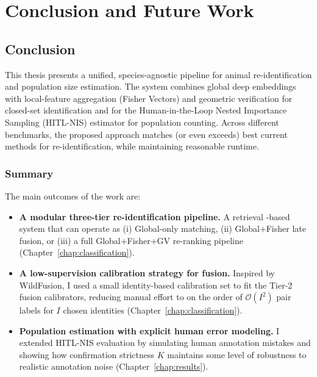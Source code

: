 \chapter{Conclusion and Future Work}
\label{chap:conclusion}

\section{Conclusion}
This thesis presents a unified, species-agnostic pipeline for animal re-identification and population size estimation. The system combines global deep embeddings with local-feature aggregation (Fisher Vectors) and geometric verification for closed-set identification and for the Human-in-the-Loop Nested Importance Sampling (HITL-NIS) estimator for population counting. Across different benchmarks, the proposed approach matches (or even exceeds) best current methods for re-identification, while maintaining reasonable runtime. 

\subsection{Summary}
The main outcomes of the work are:

\begin{itemize}
    \item \textbf{A modular three-tier re-identification pipeline.} A retrieval
    -based system that can operate as (i) Global-only matching, (ii) Global+Fisher late fusion, or (iii) a full
     Global+Fisher+GV re-ranking pipeline (Chapter~\ref{chap:classification}).
    \item \textbf{A low-supervision calibration strategy for fusion.} Inspired by WildFusion, I used a small identity-based 
    calibration set to fit the Tier-2 fusion calibrators, reducing manual effort to on the order of \(\mathcal{O}(I^2)\) pair labels for 
    \(I\) chosen identities (Chapter~\ref{chap:classification}).
    \item \textbf{Population estimation with explicit human error modeling.} I extended HITL-NIS evaluation by simulating human annotation 
    mistakes and showing how confirmation strictness \(K\) maintains some level of robustness to realistic annotation noise (Chapter~\ref{chap:results}).
\end{itemize}

